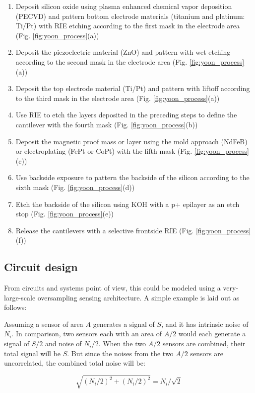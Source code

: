 \begin{enumerate}
\item Deposit silicon oxide using plasma enhanced chemical vapor deposition (PECVD) and pattern bottom electrode materials (titanium and platinum: Ti/Pt) with RIE etching according to the first mask in the electrode area (Fig. \ref{fig:yoon_process}(a))
\item Deposit the piezoelectric material (ZnO) and pattern with wet etching according to the second mask in the electrode area (Fig. \ref{fig:yoon_process}(a))
\item Deposit the top electrode material (Ti/Pt) and pattern with liftoff according to the third mask in the electrode area (Fig. \ref{fig:yoon_process}(a)) 
\item Use RIE to etch the layers deposited in the preceding steps to define the cantilever with the fourth mask (Fig. \ref{fig:yoon_process}(b))
\item Deposit the magnetic proof mass or layer using the mold approach (NdFeB) or electroplating (FePt or CoPt) with the fifth mask (Fig. \ref{fig:yoon_process}(c))
\item Use backside exposure to pattern the backside of the silicon according to the sixth mask (Fig. \ref{fig:yoon_process}(d))
\item Etch the backside of the silicon using KOH with a p+ epilayer as an etch stop (Fig. \ref{fig:yoon_process}(e))
\item Release the cantilevers with a selective frontside RIE (Fig. \ref{fig:yoon_process}(f))
\end{enumerate}
\subsection{Circuit design}
 
From circuits and systems point of view, this could be modeled using a very-large-scale oversampling sensing architecture. A simple example is laid out as follows: 

Assuming a sensor of area $A$ generates a signal of $S$, and it has intrinsic noise of $N_i$. In comparison, two sensors each with an area of $A/2$ would each generate a signal of $S/2$ and noise of $N_i/2$. When the two $A/2$ sensors are combined, their total signal will be $S$. But since the noises from the two $A/2$ sensors are uncorrelated, the combined total noise will be:

$$\sqrt{(N_i/2)^2+(N_i/2)^2} = N_i/\sqrt{2} $$

